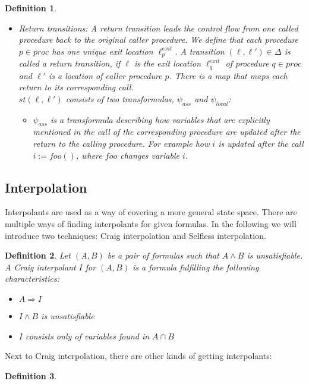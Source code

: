 \documentclass{article}
\newtheorem{mydef}{Definition}
\newcommand\mycom[1]{}
\newcommand\mycom[1]{#1}
\newcommand{\jw}[1]{\mycom{\todo[color=blue!40,inline]{\small JW: #1}}}
\begin{document}
\begin{mydef}
\begin{itemize}
			\item Return transitions: A return transition leads the control flow from one called procedure back to the original caller procedure. We define that each procedure $p \in proc$ has one unique exit location $\ell^{exit}_p$. A transition $(\ell, \ell') \in \Delta$ is called a return transition, if $\ell$ is the exit location $\ell_q^{exit}$ of procedure $q \in proc$ and $\ell'$ is a location of caller procedure $p$. There is a map that maps each return to its corresponding call. \\
			$st(\ell, \ell')$ consists of two transformulas, $\psi_{ass}$ and $\psi_{local}$: 
			\begin{itemize}
				\item $\psi_{ass}$ is a transformula describing how variables that are explicitly mentioned in the call of the corresponding procedure are updated after the return to the calling procedure. For example how $i$ is updated after the call $i := foo()$, where $foo$ changes variable $i$.
			\end{itemize}
		\end{itemize}
	\end{mydef}
	
	\jw{Do ICFG Example}
	
	\pagebreak
		
	\subsection{Interpolation}
	Interpolants are used as a way of covering a more general state space. There are multiple ways of finding interpolants for given formulas.
	In the following we will introduce two techniques: Craig interpolation and Selfless interpolation. 
	\jw{citation needed}
	
	\begin{mydef}
		Let $(A, B)$ be a pair of formulas such that $A \land B$ is unsatisfiable. A Craig interpolant $I$ for $(A, B)$ is a formula fulfilling the following characteristics:
		\begin{itemize}
			\item $A \Rightarrow I$
			\item $I \land B$ is unsatisfiable
			\item $I$ consists only of variables found in $A \cap B$
		\end{itemize}
	\end{mydef}

	Next to Craig interpolation, there are other kinds of getting interpolants:
	\begin{mydef}
		\jw{Introduce Selfless interpolation}
	\end{mydef}
	\pagebreak
	
\end{document}

